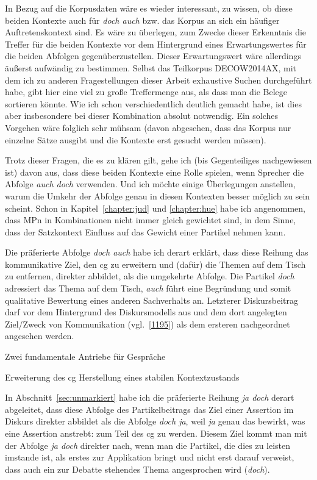 In Bezug auf die Korpusdaten wäre es wieder interessant, zu wissen, ob diese beiden Kontexte auch für \textit{doch auch} bzw. das Korpus an sich ein häufiger Auftre\-tenskontext sind. Es wäre zu überlegen, zum Zwecke dieser Erkenntnis die Treffer für die beiden Kontexte vor dem Hintergrund eines Erwartungswertes für die beiden Abfolgen gegenüberzustellen. Dieser Erwartungswert wäre allerdings äußerst aufwändig zu bestimmen. Selbst das Teilkorpus DECOW2014AX, mit dem ich zu anderen Fragestellungen dieser Arbeit exhaustive Suchen durchgeführt habe, gibt hier eine viel zu große Treffermenge aus, als dass man die Belege sortieren könnte. Wie ich schon verschiedentlich deutlich gemacht habe, ist dies aber insbesondere bei dieser Kombination absolut notwendig. Ein solches Vorgehen wäre folglich sehr mühsam (davon abgesehen, dass das Korpus nur einzelne Sätze ausgibt und die Kontexte erst gesucht werden müssen). 

Trotz dieser Fragen, die es zu klären gilt, gehe ich (bis Gegenteiliges nachgewie\-sen ist) davon aus, dass diese beiden Kontexte eine Rolle spielen, wenn Sprecher die Abfolge \textit{auch doch} verwenden. Und ich möchte einige Überlegungen anstellen, warum die Umkehr der Abfolge genau in diesen Kontexten besser möglich zu sein scheint. Schon in Kapitel~\ref{chapter:jud} und \ref{chapter:hue} habe ich angenommen, dass MPn in Kombinationen nicht immer gleich gewichtet sind, in dem Sinne, dass der Satzkontext Einfluss auf das Gewicht einer Partikel nehmen kann. 

Die präferierte Abfolge \textit{doch auch} habe ich derart erklärt, dass diese Reihung das kommunikative Ziel, den cg zu erweitern und (dafür) die Themen auf dem Tisch zu entfernen, direkter abbildet, als die umgekehrte Abfolge. Die Partikel \textit{doch} adressiert das Thema auf dem Tisch, \textit{auch} führt eine Begründung und somit qualitative Bewertung eines anderen Sachverhalts an. Letzterer Diskursbeitrag darf vor dem Hintergrund des Diskursmodells aus \citet{Farkas2010} und dem dort angelegten Ziel/Zweck von Kommunikation (vgl.\ \ref{1195}) als dem ersteren nachgeordnet angesehen werden.

\begin{exe}
	\ex\label{1195} Zwei fundamentale Antriebe für Gespräche 
		\begin{xlist}	
			\ex\label{1195a} Erweiterung des cg
			\ex\label{1195b} Herstellung eines stabilen Kontextzustands
			\newline
			\hbox{}\hfill\hbox{\citet[87]{Farkas2010}}
		\end{xlist}
\end{exe}
In Abschnitt~\ref{sec:unmarkiert} habe ich die präferierte Reihung \textit{ja doch} derart abgeleitet, dass diese Abfolge des Partikelbeitrags das Ziel einer Assertion im Diskurs direkter abbildet als die Abfolge \textit{doch ja}, weil \textit{ja} genau das bewirkt, was eine Assertion anstrebt: zum Teil des cg zu werden. Diesem Ziel kommt man mit der Abfolge \textit{ja doch} direkter nach, wenn man die Partikel, die dies zu leisten imstande ist, als erstes zur Applikation bringt und nicht erst darauf verweist, dass auch ein zur Debatte stehendes Thema angesprochen wird (\textit{doch}).  


